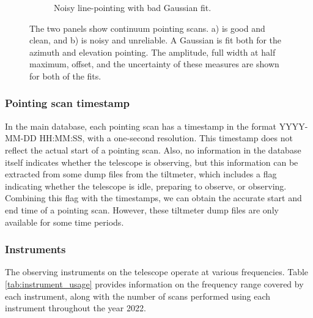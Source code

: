 \begin{figure}[H]
\begin{subfigure}[b]{0.75\textwidth}
         \caption{Noisy line-pointing with bad Gaussian fit.}
         \label{subfig:bad_continuous}
     \end{subfigure}
    \caption[Continuum scan panel]{The two panels show continuum pointing scans. a) is good and clean, and b) is noisy and unreliable. 
    A Gaussian is fit both for the azimuth and elevation pointing. The amplitude, full width at half maximum, offset, and the uncertainty of these measures are shown for both of the fits.}
    \label{fig:continueous_pointings}
\end{figure}



\subsubsection{Pointing scan timestamp} 
In the main database, each pointing scan has a timestamp in the format YYYY-MM-DD HH:MM:SS, with a one-second resolution.
This timestamp does not reflect the actual start of a pointing scan.
Also, no information in the database itself indicates whether the telescope is observing, but this information can be extracted from some dump files from the tiltmeter, which includes a flag indicating whether the telescope is idle, preparing to observe, or observing.
Combining this flag with the timestamps, we can obtain the accurate start and end time of a pointing scan. However, these tiltmeter dump files are only available for some time periods.

\subsubsection{Instruments}
The observing instruments on the telescope operate at various frequencies.
Table \ref{tab:instrument_usage} provides information on the frequency range covered by each instrument,
along with the number of scans performed using each instrument throughout the year 2022.\\

